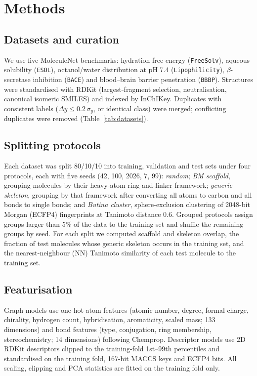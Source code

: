 \section{Methods}

\subsection{Datasets and curation}
We use five MoleculeNet benchmarks\cite{wu2018moleculenet}: hydration free energy (\texttt{FreeSolv}\cite{mobley2014freesolv}), aqueous solubility (\texttt{ESOL}\cite{delaney2004esol}), octanol/water distribution at pH 7.4 (\texttt{Lipophilicity}), $\beta$-secretase inhibition (\texttt{BACE}\cite{subramanian2016bace}) and blood--brain barrier penetration (\texttt{BBBP}\cite{martins2012bbbp}). Structures were standardised with RDKit\cite{rdkit} (largest-fragment selection, neutralisation, canonical isomeric SMILES) and indexed by InChIKey. Duplicates with consistent labels ($\Delta y \le 0.2\,\sigma_y$, or identical class) were merged; conflicting duplicates were removed (Table~\ref{tab:datasets}).

\subsection{Splitting protocols}
Each dataset was split 80/10/10 into training, validation and test sets under four protocols, each with five seeds (42, 100, 2026, 7, 99): \emph{random}; \emph{BM scaffold}\cite{bemis1996properties}, grouping molecules by their heavy-atom ring-and-linker framework; \emph{generic skeleton}, grouping by that framework after converting all atoms to carbon and all bonds to single bonds; and \emph{Butina cluster}\cite{butina1999unsupervised}, sphere-exclusion clustering of 2048-bit Morgan (ECFP4\cite{rogers2010extended}) fingerprints at Tanimoto distance 0.6. Grouped protocols assign groups larger than 5\% of the data to the training set and shuffle the remaining groups by seed. For each split we computed scaffold and skeleton overlap, the fraction of test molecules whose generic skeleton occurs in the training set, and the nearest-neighbour (NN) Tanimoto similarity of each test molecule to the training set.

\subsection{Featurisation}
Graph models use one-hot atom features (atomic number, degree, formal charge, chirality, hydrogen count, hybridisation, aromaticity, scaled mass; 133 dimensions) and bond features (type, conjugation, ring membership, stereochemistry; 14 dimensions) following Chemprop\cite{yang2019analyzing,heid2024chemprop}. Descriptor models use 2D RDKit descriptors clipped to the training-fold 1st--99th percentiles and standardised on the training fold, 167-bit MACCS keys\cite{durant2002reoptimization} and ECFP4 bits. All scaling, clipping and PCA statistics are fitted on the training fold only.


